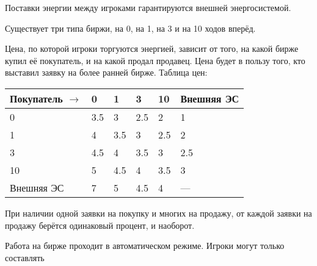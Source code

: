 Поставки энергии между игроками гарантируются внешней энергосистемой.

Существует три типа биржи, на 0, на 1, на 3 и на 10 ходов вперёд.

Цена, по которой игроки торгуются энергией, зависит от того, на какой бирже купил её покупатель, и на какой продал продавец. Цена будет в пользу того, кто выставил заявку на более ранней бирже. Таблица цен:

\begin{tabular}{|l|l|l|l|l|l|}
    \hline
    Покупатель $\rightarrow$ & 0 & 1 & 3 & 10 & Внешняя ЭС \\
    \hline
    0 & 3.5 & 3 & 2.5 & 2 & 1 \\
    \hline
    1 & 4 & 3.5 & 3 & 2.5 & 2 \\
    \hline
    3 & 4.5 & 4 & 3.5 & 3 & 2.5 \\
    \hline
    10 & 5 & 4.5 & 4 & 3.5 & 3 \\
    \hline
    Внешняя ЭС & 7 & 5 & 4.5 & 4 & — \\ 
    \hline   
\end{tabular}

При наличии одной заявки на покупку и многих на продажу, от каждой заявки на продажу берётся одинаковый процент, и наоборот.

Работа на бирже проходит в автоматическом режиме. Игроки могут только составлять 
